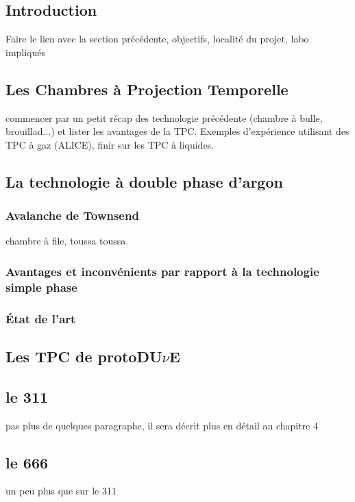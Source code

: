         \subsection{Introduction}
            Faire le lien avec la section précédente, objectifs, localité du projet, labo impliqués
    
        \subsection{Les Chambres à Projection Temporelle}
            commencer par un petit récap des technologie précédente (chambre à bulle, brouillad...) et lister les avantages de la TPC. Exemples d'expérience utilisant des TPC à gaz (ALICE), finir sur les TPC à liquides.
        
        \subsection{La technologie à double phase d'argon}
            \subsubsection{Avalanche de Townsend}
                chambre à file, toussa toussa.
            \subsubsection{Avantages et inconvénients par rapport à la technologie simple phase}\label{sec::townsend_avalanche}
            \subsubsection{État de l'art}
        
        \subsection{Les TPC de protoDU$\nu$E}
            \subsection{le 311}
                pas plus de quelques paragraphe, il sera décrit plus en détail au chapitre 4
            \subsection{le 666}
                un peu plus que sur le 311